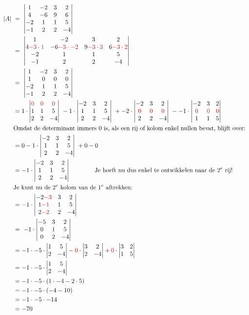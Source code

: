 \begin{align*}
	|A|  \ & = \ \detvier{1 & -2 & 3 & 2 }
	{ 4 & -6 & 9 & 6  }
	{  -2 & 1 & 1 & 5 }
	{ -1 & 2 & 2 & -4 } \\
    \ & = \ \detvier{1 & -2 & 3 & 2 }
	{ 4\red{-3\cdot1} & -6\red{-3\cdot-2} & 9\red{-3\cdot3} & 6\red{-3\cdot2}  }
	{  -2 & 1 & 1 & 5 }
	{ -1 & 2 & 2 & -4 } \\
	  & = \ \detvier{1 & -2 & 3 & 2  }
	{ 1 & 0 &  0 & 0 }
	{  -2 & 1 & 1 & 5 }
	{ -1 & 2 & 2 & -4 } \\%
	& = 1\cdot \detdrie{ \red{0} & \red{0} & \red{0} }{1 & 1 & 5 }{ 2 & 2 & -4 }\ 
    -1\cdot  \detdrie{ -2 & 3 & 2 }{1 & 1 & 5 }{ 2 & 2 & -4 }\ %
    +-2\cdot \detdrie{ -2 & 3 & 2 }{\red{0} & \red{0} & \red{0} }{ 2 & 2 & -4 }\ 
    --1\cdot \detdrie{ -2 & 3 & 2 }{\red{0} & \red{0} & \red{0} }{ 1 & 1 & 5 } \\
    &\text{Omdat de determinant immers $0$ is, als een rij of kolom enkel nullen bevat, blijft over: } \\
    &= 0 -1\cdot  \detdrie{ -2 & 3 & 2 }{1 & 1 & 5 }{ 2 & 2 & -4 }\ + 0 - 0\\
    &= -1\cdot  \detdrie{ -2 & 3 & 2 }{1 & 1 & 5 }{ 2 & 2 & -4 }\qquad \qquad \text{Je hoeft nu dus enkel te ontwikkelen naar de } 2^e \text{ rij!}\\
    &\text{Je kunt nu de } 2^e \text{ kolom van de } 1^e \text{ aftrekken: } \\ 
    &= -1\cdot  \detdrie{ -2 \red{-3} & 3 & 2 }{1 \red{-1} & 1 & 5 }{ 2\red{-2} & 2 & -4 }\\
    &= \ -1\cdot \detdrie{ -5 & 3 & 2 }{0 & 1 & 5 }{ 0 & 2 & -4 }\ \\ 
    &= -1\cdot -5\cdot \dettwee{1&5}{2&-4} - \red{0}\cdot \dettwee{3&2}{2&-4} + \red{0}\cdot\dettwee{3&2}{1&5}\\
    &= -1\cdot -5\cdot \dettwee{1&5}{2&-4}\\
    &= -1\cdot -5\cdot (1\cdot -4 -2\cdot 5) \\
    &= -1\cdot -5\cdot (-4 -10) \\
    &= -1\cdot -5\cdot -14 \\
    &= -70 \\
\end{align*}

\newpage 
